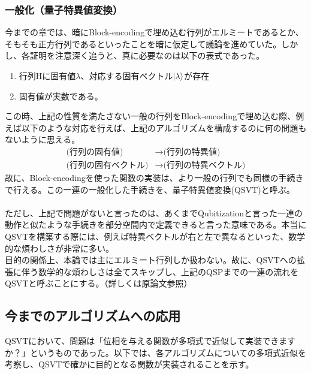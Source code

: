 \documentclass[a4paper,10.5pt]{article}
\numberwithin{equation}{section}
\begin{document}
\subsubsection{一般化（量子特異値変換）}
今までの章では、暗にBlock-encodingで埋め込む行列がエルミートであるとか、そもそも正方行列であるといったことを暗に仮定して議論を進めていた。しかし、各証明を注意深く追うと、真に必要なのは以下の表式であった。
\begin{enumerate}
    \item 行列Hに固有値$\lambda$、対応する固有ベクトル$\ket{\lambda}$が存在
    \item 固有値が実数である。
\end{enumerate}
この時、上記の性質を満たさない一般の行列をBlock-encodingで埋め込む際、例えば以下のような対応を行えば、上記のアルゴリズムを構成するのに何の問題もないように思える。
\begin{align*}
    \text{(行列の固有値)}&\to\text{(行列の特異値)}\\
    \text{(行列の固有ベクトル)}&\to\text{(行列の特異ベクトル)}
\end{align*}
故に、Block-encodingを使った関数の実装は、より一般の行列でも同様の手続きで行える。この一連の一般化した手続きを、量子特異値変換(QSVT)と呼ぶ\cite{Gilyen:2018khw}。\\
\\
ただし、上記で問題がないと言ったのは、あくまでQubitizationと言った一連の動作と似たような手続きを部分空間内で定義できると言った意味である。本当にQSVTを構築する際には、例えば特異ベクトルが右と左で異なるといった、数学的な煩わしさが非常に多い。\\
目的の関係上、本論では主にエルミート行列しか扱わない。故に、QSVTへの拡張に伴う数学的な煩わしさは全てスキップし、上記のQSPまでの一連の流れをQSVTと呼ぶことにする。（詳しくは原論文参照）

\subsection{今までのアルゴリズムへの応用}
QSVTにおいて、問題は「位相を与える関数が多項式で近似して実装できますか？」というものであった。以下では、各アルゴリズムについての多項式近似を考察し、QSVTで確かに目的となる関数が実装されることを示す。
\end{document}
